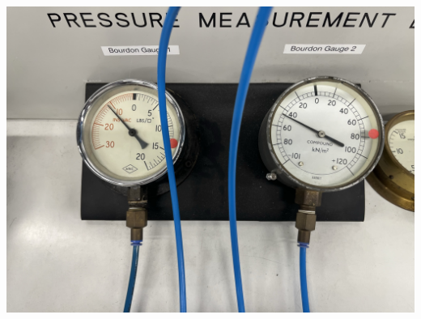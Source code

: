 \documentclass{article}
\begin{document}
	\begin{minipage}{0.45\textwidth}
			\hspace{0.9em}\begin{minipage}{1\textwidth}\centering
			\begin{minipage}{0.45\textwidth}\centering
				\includegraphics[width=1.2\textwidth]{images/Image(1).jpg}\\[0.5em]

\end{minipage}
\end{minipage}
\end{minipage}
\end{document}
